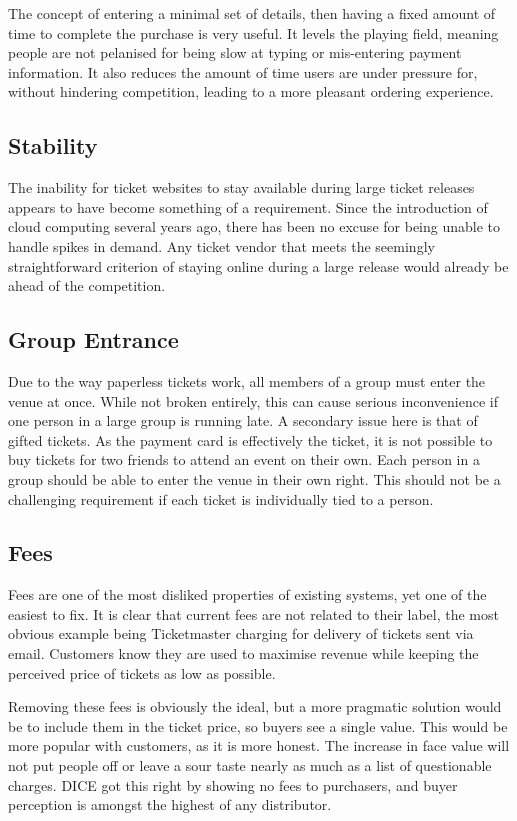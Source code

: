 \documentclass[12pt,a4]{bhamdissertation}
\begin{document}
The concept of entering a minimal set of details, then having a fixed amount of time to complete the purchase is very useful. It levels the playing field, meaning people are not pelanised for being slow at typing or mis-entering payment information. It also reduces the amount of time users are under pressure for, without hindering competition, leading to a more pleasant ordering experience.

\subsection{Stability}

The inability for ticket websites to stay available during large ticket releases appears to have become something of a requirement. Since the introduction of cloud computing several years ago, there has been no excuse for being unable to handle spikes in demand. Any ticket vendor that meets the seemingly straightforward criterion of staying online during a large release would already be ahead of the competition.

\subsection{Group Entrance}

Due to the way paperless tickets work, all members of a group must enter the venue at once. While not broken entirely, this can cause serious inconvenience if one person in a large group is running late. A secondary issue here is that of gifted tickets. As the payment card is effectively the ticket, it is not possible to buy tickets for two friends to attend an event on their own. Each person in a group should be able to enter the venue in their own right. This should not be a challenging requirement if each ticket is individually tied to a person.

\subsection{Fees}

Fees are one of the most disliked properties of existing systems, yet one of the easiest to fix. It is clear that current fees are not related to their label, the most obvious example being Ticketmaster charging for delivery of tickets sent via email. Customers know they are used to maximise revenue while keeping the perceived price of tickets as low as possible.

Removing these fees is obviously the ideal, but a more pragmatic solution would be to include them in the ticket price, so buyers see a single value. This would be more popular with customers, as it is more honest. The increase in face value will not put people off or leave a sour taste nearly as much as a list of questionable charges. DICE got this right by showing no fees to purchasers, and buyer perception is amongst the highest of any distributor.
\end{document}
